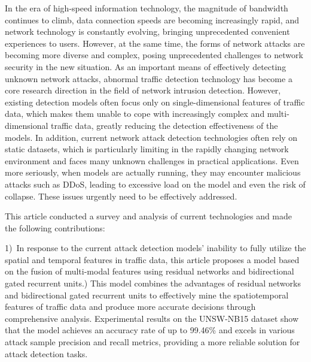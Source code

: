 \begin{eabstract} 

In the era of high-speed information technology, the magnitude of bandwidth continues to climb, data connection speeds are becoming increasingly rapid, and network technology is constantly evolving, bringing unprecedented convenient experiences to users.
However, at the same time, the forms of network attacks are becoming more diverse and complex, posing unprecedented challenges to network security in the new situation.
As an important means of effectively detecting unknown network attacks, abnormal traffic detection technology has become a core research direction in the field of network intrusion detection.
However, existing detection models often focus only on single-dimensional features of traffic data, which makes them unable to cope with increasingly complex and multi-dimensional traffic data, greatly reducing the detection effectiveness of the models.
In addition, current network attack detection technologies often rely on static datasets, which is particularly limiting in the rapidly changing network environment and faces many unknown challenges in practical applications.
Even more seriously, when models are actually running, they may encounter malicious attacks such as DDoS, leading to excessive load on the model and even the risk of collapse.
These issues urgently need to be effectively addressed.

This article conducted a survey and analysis of current technologies and made the following contributions:\par

1)~In response to the current attack detection models' inability to fully utilize the spatial and temporal features in traffic data, this article proposes a model based on the fusion of multi-modal features using residual networks and bidirectional gated recurrent units.)
This model combines the advantages of residual networks and bidirectional gated recurrent units to effectively mine the spatiotemporal features of traffic data and produce more accurate decisions through comprehensive analysis.
Experimental results on the UNSW-NB15 dataset show that the model achieves an accuracy rate of up to 99.46\% and excels in various attack sample precision and recall metrics, providing a more reliable solution for attack detection tasks.\par


\end{eabstract}
